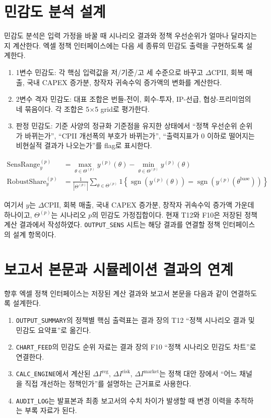 \documentclass[11pt,a4paper]{report}
\begin{document}
\section{민감도 분석 설계}
민감도 분석은 입력 가정을 바꿀 때 시나리오 결과와 정책 우선순위가 얼마나 달라지는지 계산한다. 엑셀 정책 인터페이스에는 다음 세 종류의 민감도 출력을 구현하도록 설계한다.
\begin{enumerate}[label=\arabic*.]
  \item 1변수 민감도: 각 핵심 입력값을 저/기준/고 세 수준으로 바꾸고 $\Delta \mathrm{CPII}$, 회복 매출, 국내 CAPEX 증가분, 창작자 귀속수익 증가액의 변화를 계산한다.
  \item 2변수 격자 민감도: 대표 조합은 번들-전이, 회수-투자, IP-선급, 협상-프리미엄의 네 묶음이다. 각 조합은 5$\times$5 grid로 평가한다.
  \item 판정 민감도: 기준 사양의 정규화 기준점을 유지한 상태에서 ``정책 우선순위 순위가 바뀌는가'', ``CPII 개선폭의 부호가 바뀌는가'', ``출력지표가 0 이하로 떨어지는 비현실적 결과가 나오는가''를 flag로 표시한다.
\end{enumerate}

\begin{align}
\mathrm{SensRange}^{(p)}_{y} &= \max_{\theta \in \Theta^{(p)}} y^{(p)}(\theta) - \min_{\theta \in \Theta^{(p)}} y^{(p)}(\theta) \\
\mathrm{RobustShare}^{(p)}_{y} &= \frac{1}{|\Theta^{(p)}|}\sum_{\theta \in \Theta^{(p)}} 1\!\left\{\operatorname{sgn}\!\left(y^{(p)}(\theta)\right)=\operatorname{sgn}\!\left(y^{(p)}(\theta^{\mathrm{base}})\right)\right\}
\end{align}

여기서 $y$는 $\Delta \mathrm{CPII}$, 회복 매출, 국내 CAPEX 증가분, 창작자 귀속수익 증가액 가운데 하나이고, $\Theta^{(p)}$는 시나리오 $p$의 민감도 가정집합이다. 현재 T12와 F10은 저장된 정책 계산 결과에서 작성하였다. \texttt{OUTPUT\_SENS} 시트는 해당 결과를 연결할 정책 인터페이스의 설계 항목이다.

\section{보고서 본문과 시뮬레이션 결과의 연계}
향후 엑셀 정책 인터페이스는 저장된 계산 결과와 보고서 본문을 다음과 같이 연결하도록 설계한다.
\begin{enumerate}[label=\arabic*.]
  \item \texttt{OUTPUT\_SUMMARY}의 정책별 핵심 출력표는 결과 장의 T12 ``정책 시나리오 결과 및 민감도 요약표''로 옮긴다.
  \item \texttt{CHART\_FEED}의 민감도 순위 자료는 결과 장의 F10 ``정책 시나리오 민감도 차트''로 연결한다.
  \item \texttt{CALC\_ENGINE}에서 계산된 $\Delta I^{\mathrm{reg}}$, $\Delta I^{\mathrm{risk}}$, $\Delta I^{\mathrm{market}}$는 정책 대안 장에서 ``어느 채널을 직접 개선하는 정책인가''를 설명하는 근거표로 사용한다.
  \item \texttt{AUDIT\_LOG}는 발표본과 최종 보고서의 수치 차이가 발생할 때 변경 이력을 추적하는 부록 자료가 된다.
\end{enumerate}
\end{document}
